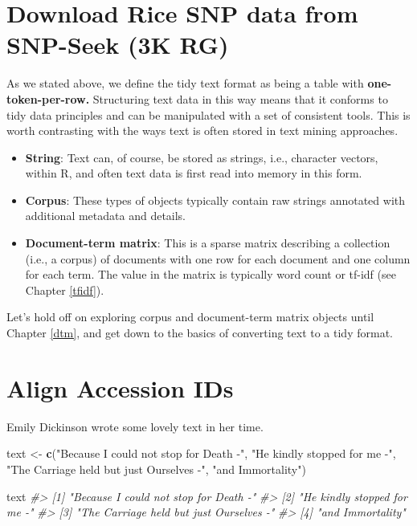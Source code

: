 \documentclass[
]{book}
\newenvironment{Shaded}{\begin{snugshade}}{\end{snugshade}}
\newcommand{\CommentTok}[1]{\textcolor[rgb]{0.56,0.35,0.01}{\textit{#1}}}
\newcommand{\FunctionTok}[1]{\textcolor[rgb]{0.13,0.29,0.53}{\textbf{#1}}}
\newcommand{\NormalTok}[1]{#1}
\newcommand{\OtherTok}[1]{\textcolor[rgb]{0.56,0.35,0.01}{#1}}
\newcommand{\StringTok}[1]{\textcolor[rgb]{0.31,0.60,0.02}{#1}}
\providecommand{\tightlist}{%
  \setlength{\itemsep}{0pt}\setlength{\parskip}{0pt}}
\begin{document}
\section{\texorpdfstring{\textbf{Download Rice SNP data from SNP-Seek (3K RG)}}{Download Rice SNP data from SNP-Seek (3K RG)}}\label{download-rice-snp-data-from-snp-seek-3k-rg}

As we stated above, we define the tidy text format as being a table with \textbf{one-token-per-row.} Structuring text data in this way means that it conforms to tidy data principles and can be manipulated with a set of consistent tools. This is worth contrasting with the ways text is often stored in text mining approaches.

\begin{itemize}
\tightlist
\item
  \textbf{String}: Text can, of course, be stored as strings, i.e., character vectors, within R, and often text data is first read into memory in this form.
\item
  \textbf{Corpus}: These types of objects typically contain raw strings annotated with additional metadata and details.
\item
  \textbf{Document-term matrix}: This is a sparse matrix describing a collection (i.e., a corpus) of documents with one row for each document and one column for each term. The value in the matrix is typically word count or tf-idf (see Chapter \ref{tfidf}).
\end{itemize}

Let's hold off on exploring corpus and document-term matrix objects until Chapter \ref{dtm}, and get down to the basics of converting text to a tidy format.

\section{\texorpdfstring{\textbf{Align Accession IDs}}{Align Accession IDs}}\label{align-accession-ids}

Emily Dickinson wrote some lovely text in her time.

\begin{Shaded}
\begin{Highlighting}[]
\NormalTok{text }\OtherTok{\textless{}{-}} \FunctionTok{c}\NormalTok{(}\StringTok{"Because I could not stop for Death {-}"}\NormalTok{,}
          \StringTok{"He kindly stopped for me {-}"}\NormalTok{,}
          \StringTok{"The Carriage held but just Ourselves {-}"}\NormalTok{,}
          \StringTok{"and Immortality"}\NormalTok{)}

\NormalTok{text}
\CommentTok{\#\textgreater{} [1] "Because I could not stop for Death {-}"  }
\CommentTok{\#\textgreater{} [2] "He kindly stopped for me {-}"            }
\CommentTok{\#\textgreater{} [3] "The Carriage held but just Ourselves {-}"}
\CommentTok{\#\textgreater{} [4] "and Immortality"}
\end{Highlighting}
\end{Shaded}
\end{document}

